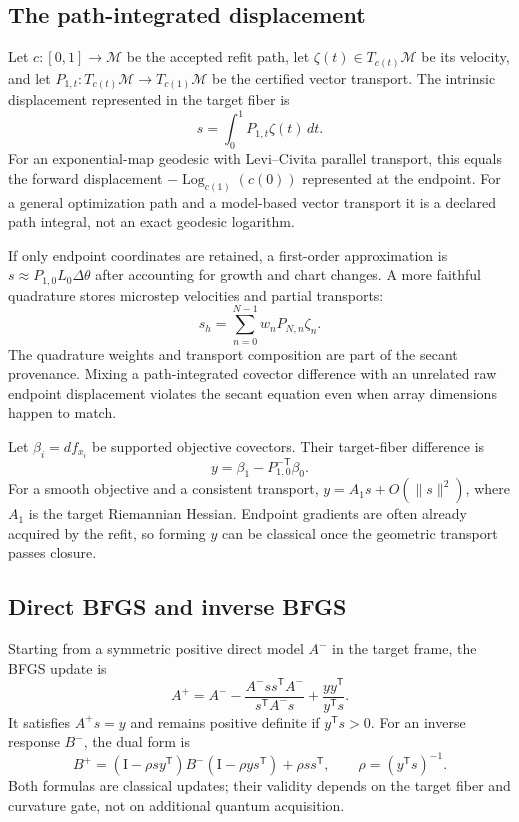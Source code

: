 \documentclass[10pt,twocolumn]{article}
\theoremstyle{definition}
\theoremstyle{remark}
\newcommand{\M}{\mathcal M}
\newcommand{\Id}{\mathrm I}
\newcommand{\Log}{\operatorname{Log}}
\begin{document}
\subsection{The path-integrated displacement}

Let $c:[0,1]\to\M$ be the accepted refit path, let
$\zeta(t)\in T_{c(t)}\M$ be its velocity, and let
$P_{1,t}:T_{c(t)}\M\to T_{c(1)}\M$ be the certified vector transport.  The
intrinsic displacement represented in the target fiber is
\begin{equation}
 s=\int_0^1 P_{1,t}\zeta(t)\,dt .
 \label{eq:appsecants}
\end{equation}
For an exponential-map geodesic with Levi--Civita parallel transport, this
equals the forward displacement $-\Log_{c(1)}(c(0))$ represented at the
endpoint.  For a general optimization path and a
model-based vector transport it is a declared path integral, not an exact
geodesic logarithm.

If only endpoint coordinates are retained, a first-order approximation is
$s\approx P_{1,0}L_0\Delta\theta$ after accounting for growth and chart
changes.  A more faithful quadrature stores microstep velocities and partial
transports:
\begin{equation}
 s_h=\sum_{n=0}^{N-1}w_nP_{N,n}\zeta_n .
 \label{eq:appsecantquadrature}
\end{equation}
The quadrature weights and transport composition are part of the secant
provenance.  Mixing a path-integrated covector difference with an unrelated
raw endpoint displacement violates the secant equation even when array
dimensions happen to match.

Let $\beta_i=df_{x_i}$ be supported objective covectors.  Their target-fiber
difference is
\begin{equation}
 y=\beta_1-P_{1,0}^{-\mathsf T}\beta_0 .
 \label{eq:appsecanty}
\end{equation}
For a smooth objective and a consistent transport,
$y=A_1s+O(\|s\|^2)$, where $A_1$ is the target Riemannian Hessian.  Endpoint
gradients are often already acquired by the refit, so forming $y$ can be
classical once the geometric transport passes closure.

\subsection{Direct BFGS and inverse BFGS}

Starting from a symmetric positive direct model $A^-$ in the target frame,
the BFGS update is
\begin{equation}
 A^+=A^-
 -\frac{A^-ss^{\mathsf T}A^-}{s^{\mathsf T}A^-s}
 +\frac{yy^{\mathsf T}}{y^{\mathsf T}s}.
 \label{eq:appdirectBFGS}
\end{equation}
It satisfies $A^+s=y$ and remains positive definite if
$y^{\mathsf T}s>0$.  For an inverse response $B^-$, the dual form is
\begin{equation}
 B^+=(\Id-\rho sy^{\mathsf T})B^-
      (\Id-\rho ys^{\mathsf T})+\rho ss^{\mathsf T},
 \qquad \rho=(y^{\mathsf T}s)^{-1}.
 \label{eq:appinverseBFGS}
\end{equation}
Both formulas are classical updates; their validity depends on the target
fiber and curvature gate, not on additional quantum acquisition.
\end{document}
